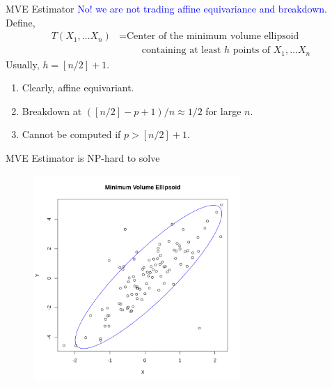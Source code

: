 \documentclass[10pt,xcolor=svgnames]{beamer} %
\begin{document}
\begin{frame}{MVE Estimator}
    \textcolor{blue}{No! we are not trading affine equivariance and breakdown}.\\
    Define,
    \begin{align*}
        T(X_1,\dots X_n) 
        & = \text{Center of the minimum volume ellipsoid }\\
        & \qquad \text{ containing at least } h \text{ points of } X_1, \dots X_n
    \end{align*}
    Usually, $h = [n/2] + 1$.
    \pause
    \begin{enumerate}
        \item Clearly, affine equivariant.
        \item Breakdown at $([n/2]-p+1)/n \approx 1/2$ for large $n$.
        \item Cannot be computed if $p > [n/2]+1$.
    \end{enumerate}
\end{frame}

\begin{frame}{MVE Estimator is NP-hard to solve}
    \begin{figure}
        \centering
        \includegraphics[width = 0.7\textwidth]{./images/mve1.png}
    \end{figure}
\end{frame}
\end{document}
